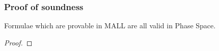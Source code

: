 \documentclass[dvipdfmx,cjk]{beamer}
\theoremstyle{example}
\begin{document}
\begin{frame}
  \frametitle{Proof of soundness}

  \begin{theorem}
    Formulae which are provable in MALL are all valid in Phase Space.
  \end{theorem}

  \begin{proof}
    
  \end{proof}
  
\end{frame}

\end{document}
